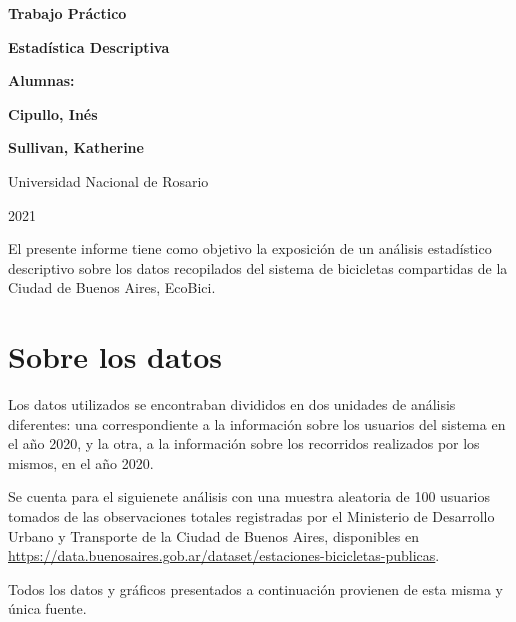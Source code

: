 \documentclass[11pt]{article}
\begin{document}
\begin{titlepage}
    \begin{center}
        \vfill
        \vfill
            \vspace{0.7cm}
            \noindent\textbf{\Huge Trabajo Pr\'actico}\par
            \noindent\textbf{\Huge Estad\'istica Descriptiva}\par
            \vspace{.5cm}
        \vfill
        \noindent \textbf{\huge Alumnas:}\par
        \vspace{.5cm}
        \noindent \textbf{\Large Cipullo, In\'es}\par
        \noindent \textbf{\Large Sullivan, Katherine}\par
 
        \vfill
        \large Universidad Nacional de Rosario \par
        \noindent\large 2021
    \end{center}
\end{titlepage}
\par

El presente informe tiene como objetivo la exposici\'on de un an\'alisis estad\'istico descriptivo
sobre los datos recopilados del sistema de bicicletas compartidas de la Ciudad de Buenos Aires, EcoBici.

\section{Sobre los datos}
Los datos utilizados se encontraban divididos en dos unidades de an\'alisis diferentes: una correspondiente
a la informaci\'on sobre los usuarios del sistema en el a\~{n}o 2020, y la otra, a la informaci\'on sobre los recorridos 
realizados por los mismos, en el a\~{n}o 2020.
\par
Se cuenta para el siguienete an\'alisis con una muestra aleatoria de 100 usuarios
tomados de las observaciones totales registradas por el Ministerio de Desarrollo Urbano y Transporte de la
Ciudad de Buenos Aires, disponibles en {\small \url{https://data.buenosaires.gob.ar/dataset/estaciones-bicicletas-publicas}}.
\par
Todos los datos y gr\'aficos presentados a continuaci\'on provienen de esta misma y \'unica fuente.
\end{document}
